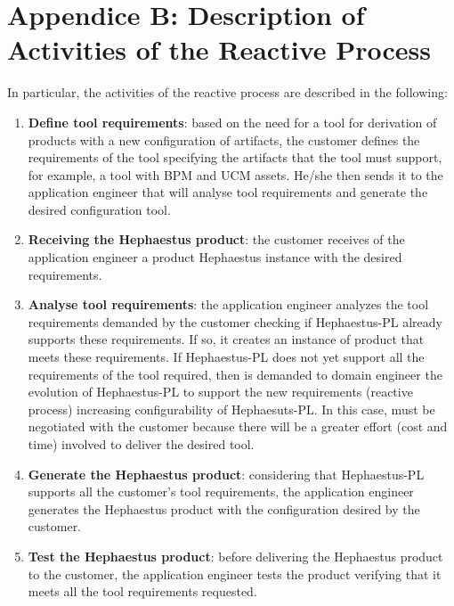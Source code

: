 \section{Appendice B: Description of Activities of the \hpl{} Reactive Process}
\label{sec:activitiesReactiveProcess}

In particular, the activities of the reactive process are described in the following:

\begin{enumerate}

  \item \textbf{Define tool requirements}: based on the need for a tool for derivation of products with a new configuration of artifacts, the customer defines the requirements of the tool specifying the artifacts that the tool must support, for example, a tool with BPM and UCM assets. He/she then sends it to the application engineer that will analyse tool requirements and generate the desired configuration tool.

  \item \textbf{Receiving the Hephaestus product}: the customer receives of the application engineer a product Hephaestus instance with the desired requirements.

  \item \textbf{Analyse tool requirements}: the application engineer analyzes the tool requirements demanded by the customer checking if Hephaestus-PL already supports these requirements. If so, it creates an instance of product that meets these requirements. If Hephaestus-PL does not yet support all the requirements of the tool required, then is demanded to domain engineer the evolution of Hephaestus-PL to support the new requirements (reactive process) increasing configurability of Hephaesuts-PL. In this case, must be negotiated with the customer because there will be a greater effort (cost and time) involved to deliver the desired tool.

  \item \textbf{Generate the Hephaestus product}: considering that Hephaestus-PL supports all the customer's tool requirements, the application engineer generates the Hephaestus product with the configuration desired by the customer.

  \item \textbf{Test the Hephaestus product}: before delivering the Hephaestus product to the customer, the application engineer tests the product verifying that it meets all the tool requirements requested.


\end{enumerate}
